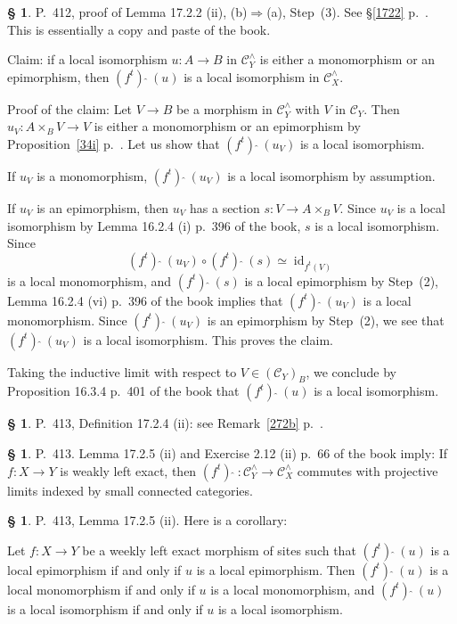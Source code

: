 \documentclass[12pt]{article}%
\theoremstyle{remark}
\theoremstyle{definition}
\newtheorem{s}[thm]{\S}%
\newcommand{\C}{\mathcal C}
\newcommand{\fthat}{(f^t)\ \widehat{}\ }
\newcommand{\then}{\Rightarrow}
\DeclareMathOperator{\id}{id}
\begin{document}
%

\begin{s}
P.~412, proof of Lemma 17.2.2 (ii), (b)$\then$(a), Step~(3). See \S\ref{1722} p.~\pageref{1722}. This is essentially a copy and paste of the book.

Claim: if a local isomorphism $u:A\to B$ in $\C_Y^\wedge$ is either a monomorphism or an epimorphism, then $\fthat(u)$ is a local isomorphism in $\C_X^\wedge$. 

Proof of the claim: Let $V\to B$ be a morphism in $\C_Y^\wedge$ with $V$ in $\C_Y$. Then $u_V: A\times_BV\to V$ is either a monomorphism or an epimorphism by Proposition~\ref{34i} p.~\pageref{34i}. Let us show that $\fthat(u_V)$ is a local isomorphism. 

If $u_V$ is a monomorphism, $\fthat(u_V)$ is a local isomorphism by assumption. 

If $u_V$ is an epimorphism, then $u_V$ has a section $s:V\to A\times_BV$. Since $u_V$ is a local isomorphism by Lemma 16.2.4 (i) p.~396 of the book, $s$ is a local isomorphism. Since 
$$
\fthat(u_V)\circ\fthat(s)\simeq\id_{f^t(V)}
$$ 
is a local monomorphism, and $\fthat(s)$ is a local epimorphism by Step~(2), Lemma 16.2.4 (vi) p.~396 of the book implies that $\fthat(u_V)$ is a local monomorphism. Since $\fthat(u_V)$ is an epimorphism by Step~(2), we see that $\fthat(u_V)$ is a local isomorphism. This proves the claim.

Taking the inductive limit with respect to $V\in(\C_Y)_B$, we conclude by Proposition 16.3.4 p.~401 of the book that $\fthat(u)$ is a local isomorphism.
\end{s}

%

\begin{s}\label{1724ii}
P.~413, Definition 17.2.4 (ii): see  Remark~\ref{272b} p.~\pageref{272b}.
\end{s}

%

\begin{s}
P.~413. Lemma 17.2.5 (ii) and Exercise 2.12 (ii) p.~66 of the book imply: If $f:X\to Y$ is weakly left exact, then $\fthat:\C_Y^\wedge\to\C_X^\wedge$ commutes with projective limits indexed by small connected categories.
\end{s} 

%

\begin{s}\label{1725ii} 
P.~413, Lemma 17.2.5 (ii). Here is a corollary: 

Let $f:X\to Y$ be a weekly left exact morphism of sites such that $\fthat(u)$ is a local epimorphism if and only if $u$ is a local epimorphism. Then $\fthat(u)$ is a local monomorphism if and only if $u$ is a local monomorphism, and $\fthat(u)$ is a local isomorphism if and only if $u$ is a local isomorphism. 
\end{s} 
\end{document}
